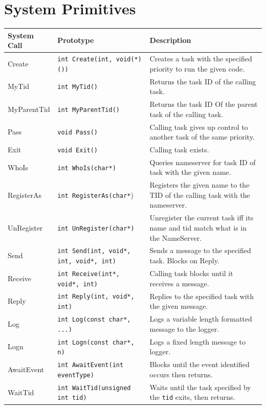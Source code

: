 \documentclass[12pt]{article}
\begin{document}
\section{System Primitives}
\begin{longtable}{|l|p{}|p{}|}
  \hline
  {\bf System Call} & {\bf Prototype} & {\bf Description} \\\hline
  Create & \texttt{int Create(int, void(*)())} & Creates a task with the specified priority to run the given code. \\\hline
  MyTid & \texttt{int MyTid()} & Returns the task ID of the calling task. \\\hline
  MyParentTid & \texttt{int MyParentTid()} & Returns the task ID Of the parent task of the calling task. \\\hline
  Pass & \texttt{void Pass()} & Calling task gives up control to another task of the same priority. \\\hline
  Exit & \texttt{void Exit()} & Calling task exists. \\\hline
  WhoIs & \texttt{int WhoIs(char*)} & Queries nameserver for task ID of task with the given name. \\\hline
  RegisterAs & \texttt{int RegisterAs(char*}) & Registers the given name to the TID of the calling task with the nameserver. \\\hline
  UnRegister & \texttt{int UnRegister(char*)} & Unregister the current task iff its name and tid match what is in the NameServer. \\\hline
  Send & \texttt{int Send(int, void*, int, void*, int)} & Sends a message to the specified task. Blocks on Reply. \\\hline
  Receive & \texttt{int Receive(int*, void*, int)} & Calling task blocks until it receives a message. \\\hline
  Reply & \texttt{int Reply(int, void*, int)} & Replies to the specified task with the given message. \\\hline
  Log & \texttt{int Log(const char*, ...)} & Logs a variable length formatted message to the logger. \\\hline
  Logn & \texttt{int Logn(const char*, n)} & Logs a fixed length message to logger. \\\hline
  AwaitEvent & \texttt{int AwaitEvent(int eventType)} & Blocks until the event identified occurs then returns. \\\hline
  WaitTid & \texttt{int WaitTid(unsigned int tid)} & Waits until the task specified by the \texttt{tid} exits, then returns. \\\hline

\end{longtable}
\end{document}
